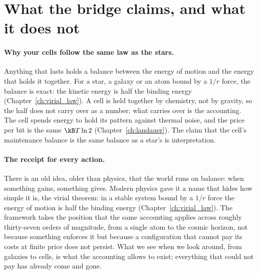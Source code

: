\section{What the bridge claims, and what it does not}

\paragraph{Why your cells follow the same law as the stars.} Anything that lasts holds a balance between the energy of motion and the energy
that holds it together. For a star, a galaxy or an atom bound by a $1/r$ force, the balance is exact: the kinetic energy is half the binding
energy (Chapter~\ref{ch:virial_law}). \derived{} A cell is held together by chemistry, not by gravity, so the half does not carry over as a
number; what carries over is the accounting. The cell spends energy to hold its pattern against thermal noise, and the price per bit is the
same $\kB T\ln2$ (Chapter~\ref{ch:landauer}). \derived{} The claim that the cell's maintenance balance is the same balance as a star's is
interpretation. \interp

\paragraph{The receipt for every action.} There is an old idea, older than physics, that the world runs on balance: when something gains,
something gives. Modern physics gave it a name that hides how simple it is, the virial theorem: in a stable system bound by a $1/r$ force
the energy of motion is half the binding energy (Chapter~\ref{ch:virial_law}). \derived{} The framework takes the position that the same
accounting applies across roughly thirty-seven orders of magnitude, from a single atom to the cosmic horizon, not because something
enforces it but because a configuration that cannot pay its costs at finite price does not persist. What we see when we look around, from
galaxies to cells, is what the accounting allows to exist; everything that could not pay has already come and gone. \conjecture

